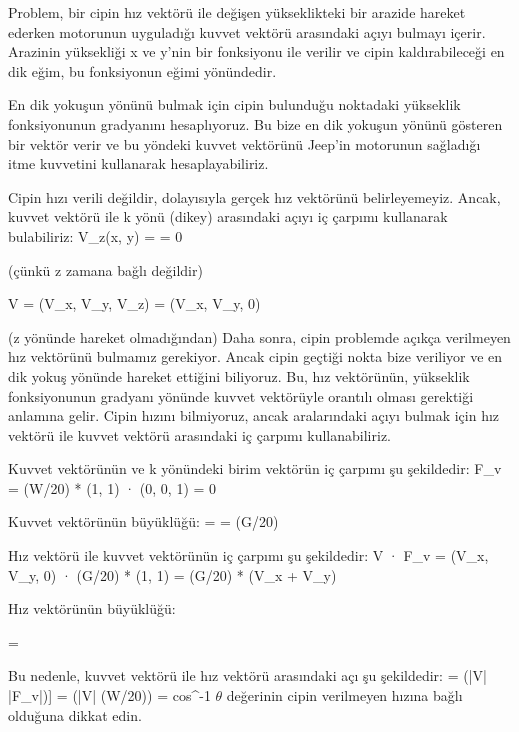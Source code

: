 \documentclass[12pt]{article}
\begin{document}
\bigbreak
Problem, bir cipin hız vektörü ile değişen yükseklikteki bir arazide hareket ederken motorunun uyguladığı kuvvet vektörü arasındaki açıyı bulmayı içerir. Arazinin yüksekliği x ve y'nin bir fonksiyonu ile verilir ve cipin kaldırabileceği en dik eğim, bu fonksiyonun eğimi yönündedir.

En dik yokuşun yönünü bulmak için cipin bulunduğu noktadaki yükseklik fonksiyonunun gradyanını hesaplıyoruz. Bu bize en dik yokuşun yönünü gösteren bir vektör verir ve bu yöndeki kuvvet vektörünü Jeep'in motorunun sağladığı itme kuvvetini kullanarak hesaplayabiliriz.



Cipin hızı verili değildir, dolayısıyla gerçek hız vektörünü belirleyemeyiz. Ancak, kuvvet vektörü ile k yönü (dikey) arasındaki açıyı iç çarpımı kullanarak bulabiliriz:
\bigbreak
V_z(x, y) =  = 0 

(çünkü z zamana bağlı değildir)

V = (V_x, V_y, V_z) = (V_x, V_y, 0) 

(z yönünde hareket olmadığından)
\bigbreak
Daha sonra, cipin problemde açıkça verilmeyen hız vektörünü bulmamız gerekiyor. Ancak cipin geçtiği nokta bize veriliyor ve en dik yokuş yönünde hareket ettiğini biliyoruz. Bu, hız vektörünün, yükseklik fonksiyonunun gradyanı yönünde kuvvet vektörüyle orantılı olması gerektiği anlamına gelir. Cipin hızını bilmiyoruz, ancak aralarındaki açıyı bulmak için hız vektörü ile kuvvet vektörü arasındaki iç çarpımı kullanabiliriz.






Kuvvet vektörünün ve k yönündeki birim vektörün iç çarpımı şu şekildedir:
\bigbreak
F_v = (W/20) * (1, 1) · (0, 0, 1) = 0

Kuvvet vektörünün büyüklüğü:
\bigbreak
{}\mid =  = (G/20) \times {}

Hız vektörü ile kuvvet vektörünün iç çarpımı şu şekildedir:
\bigbreak
V · F_v = (V_x, V_y, 0) · (G/20) * (1, 1) = (G/20) * (V_x + V_y)

Hız vektörünün büyüklüğü:

\mid = 

Bu nedenle, kuvvet vektörü ile hız vektörü arasındaki açı şu şekildedir:
\bigbreak
\LARGE
\theta = \frac{cos^{-1}[(V . F_v)} {(|V| \times |F_v|)]} = \frac{cos^{-1}[(W/20)(V_x + V_y)} {(|V| \times (W/20))} = cos^{-1}\frac{[(V_x + V_y)}{(\sqrt{2} |V|)]}
\bigbreak
\normalsize
$\theta$ değerinin cipin verilmeyen hızına bağlı olduğuna dikkat edin.
\end{document}
